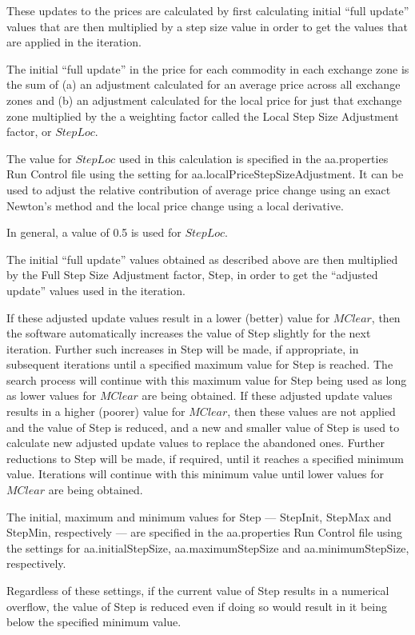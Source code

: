 These updates to the prices are calculated by first calculating initial ``full update'' values that are then multiplied by a step size value in order to get the values that are applied in the iteration.

The initial ``full update'' in the price for each commodity in each exchange zone is the sum of (a) an adjustment calculated for an average price across all exchange zones and (b) an adjustment calculated for the local price for just that exchange zone multiplied by the a weighting factor called the Local Step Size Adjustment factor, or $StepLoc$.

The value for $StepLoc$ used in this calculation is specified in the aa.properties Run Control file using the setting for aa.localPriceStepSizeAdjustment. It can be used to adjust the relative contribution of average price change using an exact Newton's method and the local price change using a local derivative.

In general, a value of 0.5 is used for $StepLoc$.

The initial ``full update'' values obtained as described above are then multiplied by the Full Step Size Adjustment factor, Step, in order to get the ``adjusted update'' values used in the iteration.

If these adjusted update values result in a lower (better) value for $MClear$, then the software automatically increases the value of Step slightly for the next iteration. Further such increases in Step will be made, if appropriate, in subsequent iterations until a specified maximum value for Step is reached.  The search process will continue with this maximum value for Step being used as long as lower values for $MClear$ are being obtained.  If these adjusted update values results in a higher (poorer) value for $MClear$, then these values are not applied and the value of Step is reduced, and a new and smaller value of Step is used to calculate new adjusted update values to replace the abandoned ones. Further reductions to Step will be made, if required, until it reaches a specified minimum value. Iterations will continue with this minimum value until lower values for $MClear$ are being obtained.

The initial, maximum and minimum values for Step --- StepInit, StepMax and StepMin, respectively --- are specified in the aa.properties Run Control file using the settings for aa.initialStepSize, aa.maximumStepSize and aa.minimumStepSize, respectively. 

Regardless of these settings, if the current value of Step results in a numerical overflow, the value of Step is reduced even if doing so would result in it being below the specified minimum value.

